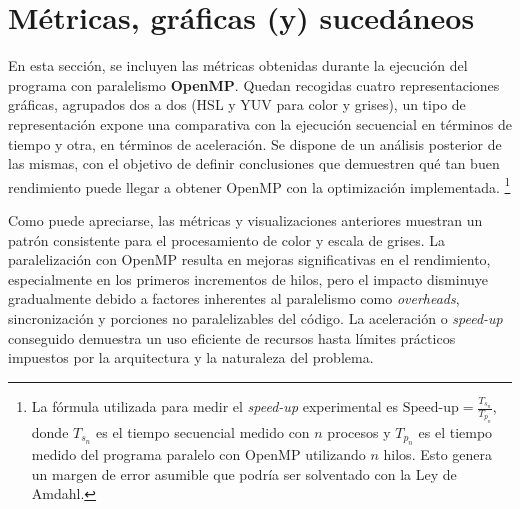 \section{Métricas, gráficas (y) sucedáneos}
En esta sección, se incluyen las métricas obtenidas durante la ejecución del programa con paralelismo \textbf{OpenMP}. Quedan recogidas cuatro representaciones gráficas, agrupados dos a dos (HSL y YUV para color y grises), un tipo de representación expone una comparativa con la ejecución secuencial en términos de tiempo y otra, en términos de aceleración. Se dispone de un análisis posterior de las mismas, con el objetivo de definir conclusiones que demuestren qué tan buen rendimiento puede llegar a obtener OpenMP con la optimización implementada.
\footnote{\label{note:speedup}La fórmula utilizada para medir el \textit{speed-up} experimental es 
$\text{Speed-up} = \frac{T_{s_n}}{T_{p_n}}$, donde $T_{s_n}$ es el tiempo secuencial medido con $n$ procesos y $T_{p_n}$ es el tiempo medido del programa paralelo con OpenMP utilizando $n$ hilos. Esto genera un margen de error asumible que podría ser solventado con la Ley de Amdahl.}


\newpage
{}

Como puede apreciarse, las métricas y visualizaciones anteriores muestran un patrón consistente para el procesamiento de color y escala de grises. La paralelización con OpenMP resulta en mejoras significativas en el rendimiento, especialmente en los primeros incrementos de hilos, pero el impacto disminuye gradualmente debido a factores inherentes al paralelismo como \textit{overheads}, sincronización y porciones no paralelizables del código. La aceleración o \textit{speed-up} conseguido demuestra un uso eficiente de recursos hasta límites prácticos impuestos por la arquitectura y la naturaleza del problema.